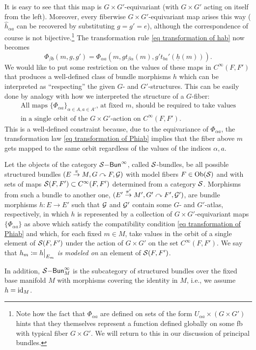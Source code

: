 It is easy to see that this map is $G\times G'$-equivariant (with $G\times G'$ acting on itself from the left). Moreover, every fiberwise $G\times G'$-equivariant map arises this way ($\hat{h}_{\alpha a}$ can be recovered by substituting $g=g'=e$), although the correspondence of course is not bijective.\footnote{Note how the fact that $\Phi_{\alpha a}$ are defined on sets of the form $U_{\alpha a}\times (G\times G')$ hints that they themselves represent a function defined globally on some \gls{fb} with typical fiber $G\times G'$. We will return to this in our discussion of principal bundles.} The transformation rule \eqref{eq transformation of hab} now becomes
\[\boxed{\Phi_{\beta b}(m,g,g')=\Phi_{\alpha a}\left(m,gt_{\beta\alpha}(m),g't_{ba}'(\underline{h}(m))\right).}\label{eq transformation of Phiab}\]
We would like to put some restriction on the values of these maps in $C^\infty(F,F')$ that produces a well-defined class of bundle morphisms $h$ which can be interpreted as ``respecting'' the given $G$- and $G'$-structures. This can be easily done by analogy with how we interpreted the structure of a $G$-fiber:
\begin{gather}
    \text{All maps }\{\Phi_{\alpha a}\}_{\alpha\in A,a\in A'}\text{, at fixed }m\text{, should be required to take values}\\
    \text{in a single orbit of the }G\times G'\text{-action on }C^\infty(F,F').
\end{gather}
This is a well-defined constraint because, due to the equivariance of $\Phi_{\alpha a}$, the transformation law \eqref{eq transformation of Phiab} implies that the fiber above $m$ gets mapped to the same orbit regardless of the values of the indices $\alpha,a$.

\begin{defn}\label{def S-bundle}
    Let the objects of the category $\mathcal{S}\mathsf{-Bun}^\infty$, called $\mathcal{S}$-bundles, be all possible structured bundles $(E\overset{\pi}{\to}M,G\curvearrowright F,\mathcal{G})$ with model fibers $F\in\operatorname{Ob}(\mathcal{S})$ and with sets of maps $\mathcal{S}(F,F')\subset C^\infty(F,F')$ determined from a category $\mathcal{S}$. Morphisms from such a bundle to another one, $(E'\overset{\pi'}{\to}M',G'\curvearrowright F',\mathcal{G}')$, are bundle morphisms $h:E\to E'$ such that $\mathcal{G}$ and $\mathcal{G}'$ contain some $G$- and $G'$-atlas, respectively, in which $h$ is represented by a collection of $G\times G'$-equivariant maps $\{\Phi_{\alpha a}\}$ as above which satisfy the compatibility condition \eqref{eq transformation of Phiab} and which, for each fixed $m\in M$, take values in the orbit of a single element of $\mathcal{S}(F,F')$ under the action of $G\times G'$ on the set $C^\infty(F,F')$. We say that $h_m\coloneqq \restr{h}{E_m}$ \emph{is modeled on} an element of $\mathcal{S}(F,F')$.

    In addition, ${\mathcal{S}\mathsf{-Bun}}_M^\infty$ is the subcategory of structured bundles over the fixed base manifold $M$ with morphisms covering the identity in $M$, i.e., we assume $h=\operatorname{id}_M$.
\end{defn}


